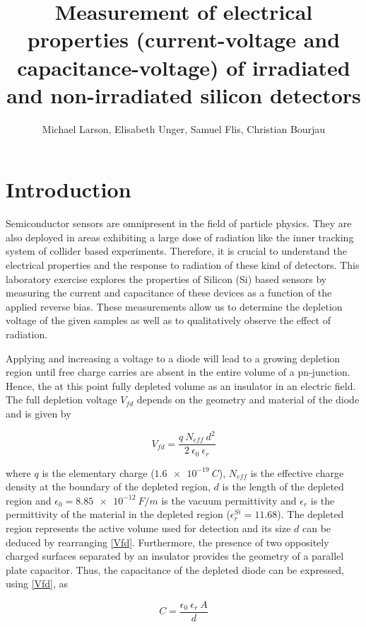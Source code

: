\documentclass[11pt]{report}
\title{Measurement of electrical properties (current-voltage and capacitance-voltage) of irradiated and non-irradiated silicon detectors}
\author{Michael Larson, Elisabeth Unger, Samuel Flis, Christian Bourjau}
\begin{document}
\maketitle

\section*{Introduction}
\label{sec:introduction}

Semiconductor sensors are omnipresent in the field of particle physics.
They are also deployed in areas exhibiting a large dose of radiation like the inner tracking system of collider based experiments.
Therefore, it is crucial to understand the electrical properties and the response to radiation of these kind of detectors.
This laboratory exercise explores the  properties of Silicon (Si) based sensors by measuring the current and capacitance of these devices as a function of the applied reverse bias.
These measurements allow us to determine the depletion voltage of the given samples as well as to qualitatively observe the effect of radiation.

Applying and increasing a voltage to a diode will lead to a growing depletion region until free charge carries are absent in the entire volume of a pn-junction. Hence, the at this point fully depleted volume as an insulator in an electric field. The full depletion voltage $V_{fd}$ depends on the geometry and material of the diode and is given by 

\begin{equation}
  \label{Vfd}
  V_{fd} = \frac{q ~ N_{eff} ~ d^2}{2 ~ \epsilon_0 ~ \epsilon_r}
\end{equation}

where $q$ is the elementary charge ($\SI{1.6e-19}{C}$), $N_{eff}$ is the effective charge density at the boundary of the depleted region, $d$ is the length of the depleted region and $\epsilon_0 = \SI{8.85e-12}{F/m}$ is the vacuum permittivity and $\epsilon_r$ is the permittivity of the material in the depleted region ($\epsilon_r^{Si} = 11.68$).
The depleted region represents the active volume used for detection and its size $d$ can be deduced by rearranging \eqref{Vfd}. 
Furthermore, the presence of two oppositely charged surfaces separated by an insulator provides the geometry of a parallel plate capacitor. Thus, the capacitance of the depleted diode can be expressed, using \eqref{Vfd}, as

\begin{equation}
  \label{C}
  C = \frac{\epsilon_{0} ~ \epsilon_{r} ~ A}{d}
\end{equation}
\end{document}
